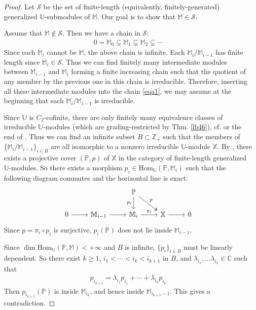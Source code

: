 \documentclass[11pt,b5paper,notitlepage]{article}
\theoremstyle{definition}
\theoremstyle{plain}
\newcommand{\mc}{\mathcal}
\newcommand{\Hom}{\mathrm{Hom}}
\newcommand{\Ubb}{\mathbb U}
\newcommand{\Xbb}{\mathbb X}
\newcommand{\Mbb}{\mathbb M}
\newcommand{\Cbb}{\mathbb C}
\newcommand{\Zbb}{\mathbb Z}
\newcommand{\Pbb}{\mathbb P}
\newcommand{\<}{\left\langle}
\renewcommand{\>}{\right\rangle}
\numberwithin{equation}{subsection}
\begin{document}
\begin{proof}
Let $\mc S$ be the set of finite-length (equivalently, finitely-generated) generalized $\Ubb$-submodules of $\Mbb$. Our goal is to show that $\Mbb\in\mc S$. 

Assume that $\Mbb\notin\mc S$. Then we have a chain in $\mc S$:
\begin{gather*}
0=\Mbb_0\subsetneq\Mbb_1 \subsetneq\Mbb_2\subsetneq \cdots  \tag{$\star$} \label{eqa1}
\end{gather*}
Since each $\Mbb_i$ cannot be $\Mbb$, the above chain is infinite. Each $\Mbb_i/\Mbb_{i-1}$ has finite length since  $\Mbb_i\in\mc S$. Thus we can find finitely many intermediate modules between $\Mbb_{i-1}$ and $\Mbb_i$ forming a finite increasing chain such that the quotient of any member by the previous one in this chain is irreducible. Therefore, inserting all these intermediate modules into the chain \eqref{eqa1}, we may assume at the beginning that each $\Mbb_i/\Mbb_{i-1}$ is irreducible. 

Since $\Ubb$ is $C_2$-cofinite, there are only finitely many equivalence classes of irreducible $\Ubb$-modules (which are grading-restricted by Thm. \ref{lb46}), cf. \cite[Prop. 4.2]{Hua-projectivecover} or the end of \cite[Sec. 12]{Gui-sewingconvergence}. Thus we can find an infinite subset $B\subset\Zbb_+$ such that the  members of $\{\Mbb_i/\Mbb_{i-1}\}_{i\in B}$ are all isomorphic to a nonzero irreducible $\Ubb$-module $\Xbb$. By \cite[Thm. 3.23]{Hua-projectivecover}, there exists a projective cover $(\Pbb,p)$ of $\Xbb$ in the category of finite-length generalized $\Ubb$-modules. So there exists a morphism $p_i\in\Hom_\Ubb(\Pbb,\Mbb_i)$ such that the following diagram commutes and the horizontal line is exact:
\begin{equation}
\begin{tikzcd}
            &             & \Pbb \arrow[d,"p_i"'] \arrow[rd, two heads, "p"] &             &   \\
0 \arrow[r] & \Mbb_{i-1} \arrow[r] & \Mbb_i \arrow[r,"\pi_i"]            & \Xbb \arrow[r] & 0
\end{tikzcd}
\end{equation}
Since $p=\pi_i\circ p_i$ is surjective, $p_i(\Pbb)$ does not lie inside $\Mbb_{i-1}$.

Since $\dim\Hom_\Ubb(\Pbb,\Mbb)<+\infty$ and $B$ is infinite, $\{p_i\}_{i\in B}$ must be linearly dependent. So there exist $k\geq 1$, $i_1<\cdots<i_k<i_{k+1}$ in $B$, and $\lambda_{i_1},\dots\lambda_{i_k}\in\Cbb$ such that 
\begin{align*}
p_{i_{k+1}}=\lambda_{i_1}p_{i_1}+\cdots+\lambda_{i_k}p_{i_k}
\end{align*}
Then $p_{i_{k+1}}(\Pbb)$ is inside $\Mbb_{i_k}$, and hence inside $\Mbb_{i_{k+1}-1}$. This gives a contradiction.
\end{proof}
\end{document}
